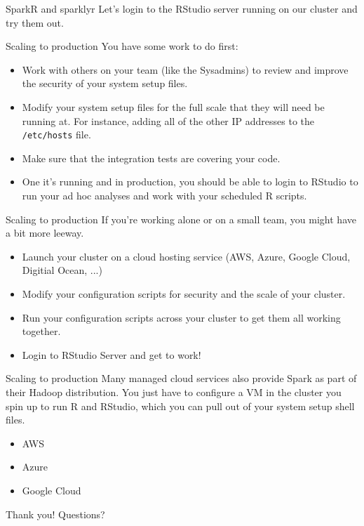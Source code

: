 \documentclass[pdf]{beamer}
\begin{document}
\begin{frame}{SparkR and sparklyr}
    Let's login to the RStudio server running on our cluster and try them out.
\end{frame}

\begin{frame}{Scaling to production}
    You have some work to do first:
    \begin{itemize}
	\item Work with others on your team (like the Sysadmins) to review and improve the security of your system setup files.
	\item Modify your system setup files for the full scale that they will need be running at. For instance, adding all of the other IP addresses to the \texttt{/etc/hosts} file.
	\item Make sure that the integration tests are covering your code.
	\item One it's running and in production, you should be able to login to RStudio to run your ad hoc analyses and work with your scheduled R scripts.
    \end{itemize}
\end{frame}

\begin{frame}{Scaling to production}
    If you're working alone or on a small team, you might have a bit more leeway.
    \begin{itemize}
	\item Launch your cluster on a cloud hosting service (AWS, Azure, Google Cloud, Digitial Ocean, ...)
	\item Modify your configuration scripts for security and the scale of your cluster.
	\item Run your configuration scripts across your cluster to get them all working together.
	\item Login to RStudio Server and get to work!
    \end{itemize}
\end{frame}

\begin{frame}{Scaling to production}
    Many managed cloud services also provide Spark as part of their Hadoop distribution. You just have to configure a VM in the cluster you spin up to run R and RStudio, which you can pull out of your system setup shell files.
    \begin{itemize}
	\item AWS
	\item Azure
	\item Google Cloud
    \end{itemize}
\end{frame}

\begin{frame}{Thank you!}
Questions?
\end{frame}
\end{document}
